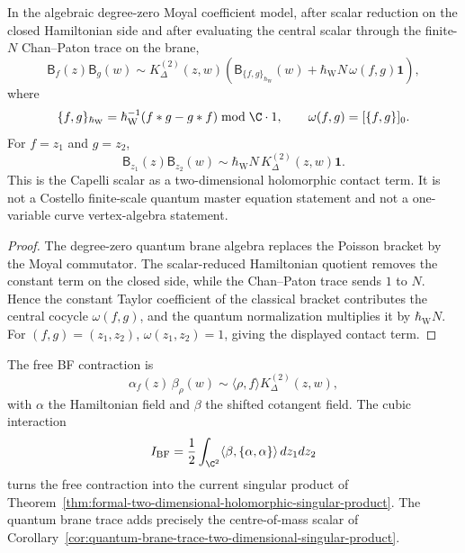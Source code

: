 \begin{cor}
\label{cor:quantum-brane-trace-two-dimensional-singular-product}
In the algebraic degree-zero Moyal coefficient model, after scalar
reduction on the closed Hamiltonian side and after evaluating the
central scalar through the finite-\(N\) Chan--Paton trace on the brane,
\[
  \mathsf{B}_f(z)\mathsf{B}_g(w)
  \sim
  K^{(2)}_\Delta(z,w)
  \left(
    \mathsf{B}_{\{f,g\}_{\hbar_{\mathrm{W}}}}(w)
    +
    \hbar_{\mathrm{W}} N\,\omega(f,g)\mathbf 1
  \right),
\]
where
\[
  \{f,g\}_{\hbar_{\mathrm{W}}}=\hbar_{\mathrm{W}}^{-1}(f*g-g*f)\bmod \C\cdot1,\qquad
  \omega(f,g)=[\{f,g\}]_0 .
\]
For \(f=z_1\) and \(g=z_2\),
\[
  \mathsf{B}_{z_1}(z)\mathsf{B}_{z_2}(w)
  \sim
  \hbar_{\mathrm{W}} N\,K^{(2)}_\Delta(z,w)\mathbf 1 .
\]
This is the Capelli scalar as a two-dimensional holomorphic contact term.
It is not a Costello finite-scale quantum master equation statement and
not a one-variable curve vertex-algebra statement.
\end{cor}

\begin{proof}
The degree-zero quantum brane algebra replaces the Poisson bracket by
the Moyal commutator.  The scalar-reduced Hamiltonian quotient removes
the constant term on the closed side, while the Chan--Paton trace sends
\(1\) to \(N\).  Hence the constant Taylor coefficient of the classical
bracket contributes the central cocycle \(\omega(f,g)\), and the
quantum normalization multiplies it by \(\hbar_{\mathrm{W}} N\).  For
\((f,g)=(z_1,z_2)\), \(\omega(z_1,z_2)=1\), giving the displayed
contact term.
\end{proof}

\begin{rmk}
The free BF contraction is
\[
  \alpha_f(z)\,\beta_\rho(w)
  \sim
  \langle\rho,f\rangle K^{(2)}_\Delta(z,w),
\]
with \(\alpha\) the Hamiltonian field and \(\beta\) the shifted
cotangent field.  The cubic interaction
\[
  I_{\mathrm{BF}}
  =
  \frac12\int_{\C^2}\langle\beta,\{\alpha,\alpha\}\rangle\,dz_1dz_2
\]
turns the free contraction into the current singular product of
Theorem~\ref{thm:formal-two-dimensional-holomorphic-singular-product}.  The quantum
brane trace adds precisely the centre-of-mass scalar of
Corollary~\ref{cor:quantum-brane-trace-two-dimensional-singular-product}.
\end{rmk}
